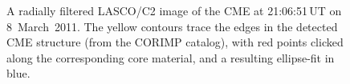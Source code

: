 \documentclass[namedreferences]{solarphysics}
\begin{document}
\begin{article}
\begin{figure}[t]
\caption{A radially filtered LASCO/C2 image of the CME at 21:06:51\,UT on 8~March~2011. The yellow contours trace the edges in the detected CME structure (from the CORIMP catalog), with red points clicked along the corresponding core material, and a resulting ellipse-fit in blue.}
\label{lasco_c2_fig}
\end{figure}


\end{article}
\end{document}
